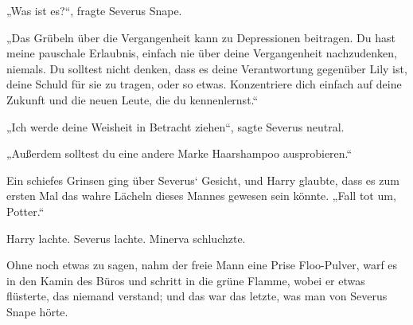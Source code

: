 „Was ist es?“, fragte Severus Snape.

„Das Grübeln über die Vergangenheit kann zu Depressionen beitragen. Du hast meine pauschale Erlaubnis, einfach nie über deine Vergangenheit nachzudenken, niemals. Du solltest nicht denken, dass es deine Verantwortung gegenüber Lily ist, deine Schuld für sie zu tragen, oder so etwas. Konzentriere dich einfach auf deine Zukunft und die neuen Leute, die du kennenlernst.“

„Ich werde deine Weisheit in Betracht ziehen“, sagte Severus neutral.

„Außerdem solltest du eine andere Marke Haarshampoo ausprobieren.“

Ein schiefes Grinsen ging über Severus‘ Gesicht, und Harry glaubte, dass es zum ersten Mal das wahre Lächeln dieses Mannes gewesen sein könnte.
„Fall tot um, Potter.“

Harry lachte. Severus lachte. Minerva schluchzte.

Ohne noch etwas zu sagen, nahm der freie Mann eine Prise Floo-Pulver, warf es in den Kamin des Büros und schritt in die grüne Flamme, wobei er etwas flüsterte, das niemand verstand; und das war das letzte, was man von Severus Snape hörte.
